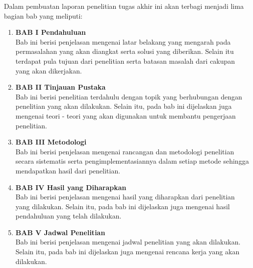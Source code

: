 Dalam pembuatan laporan penelitian tugas akhir ini akan terbagi menjadi lima bagian bab yang meliputi:

\begin{enumerate}[nolistsep]

  \item \textbf{BAB I Pendahuluan} \\     
      Bab ini berisi penjelasan mengenai latar belakang yang mengarah pada permasalahan yang akan diangkat serta solusi yang diberikan. Selain itu terdapat pula tujuan dari penelitian serta batasan masalah dari cakupan yang akan dikerjakan.
        \vspace{2ex}

  \item \textbf{BAB II Tinjauan Pustaka} \\
      Bab ini berisi penelitian terdahulu dengan topik yang berhubungan dengan penelitian yang akan dilakukan. Selain itu, pada bab ini dijelaskan juga mengenai teori - teori yang akan digunakan untuk membantu pengerjaan penelitian.

        \vspace{2ex}

  \item \textbf{BAB III Metodologi} \\
      Bab ini berisi penjelasan mengenai rancangan dan metodologi penelitian secara sistematis serta pengimplementasiannya dalam setiap metode sehingga mendapatkan hasil dari penelitian.

        \vspace{2ex}

  \item \textbf{BAB IV Hasil yang Diharapkan} \\
      Bab ini berisi penjelasan mengenai hasil yang diharapkan dari penelitian yang dilakukan. Selain itu, pada bab ini dijelaskan juga mengenai hasil pendahuluan yang telah dilakukan.

        \vspace{2ex}

  \item \textbf{BAB V Jadwal Penelitian} \\
      Bab ini berisi penjelasan mengenai jadwal penelitian yang akan dilakukan. Selain itu, pada bab ini dijelaskan juga mengenai rencana kerja yang akan dilakukan.

\end{enumerate}
